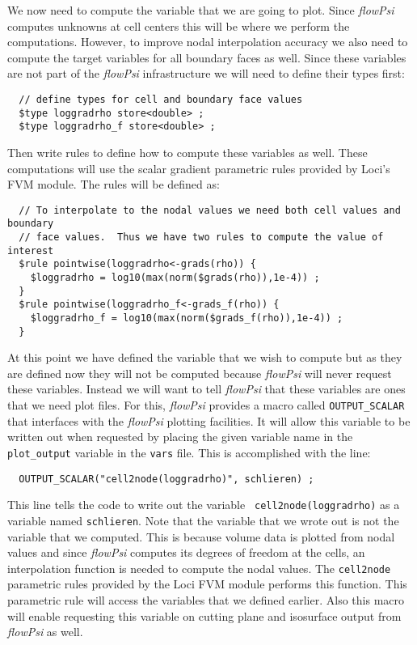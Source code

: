 \documentclass[letterpaper,twoside]{article}
\begin{document}
We now need to compute the variable that we are going to plot.  Since
{\it flowPsi} computes unknowns at cell centers this will be where we perform
the computations.  However, to improve nodal interpolation accuracy we
also need to compute the target variables for all boundary faces as
well.  Since these variables are not part of the {\it flowPsi} infrastructure
we will need to define their types first:
\begin{verbatim}
  // define types for cell and boundary face values
  $type loggradrho store<double> ;
  $type loggradrho_f store<double> ;
\end{verbatim}
Then write rules to define how to compute these variables as well.
These computations will use the scalar gradient parametric rules
provided by Loci's FVM module.  The rules will be defined as:
\begin{verbatim}
  // To interpolate to the nodal values we need both cell values and boundary
  // face values.  Thus we have two rules to compute the value of interest
  $rule pointwise(loggradrho<-grads(rho)) {
    $loggradrho = log10(max(norm($grads(rho)),1e-4)) ;
  }
  $rule pointwise(loggradrho_f<-grads_f(rho)) {
    $loggradrho_f = log10(max(norm($grads_f(rho)),1e-4)) ;
  }
\end{verbatim}

At this point we have defined the variable that we wish to compute but
as they are defined now they will not be computed because {\it flowPsi} will
never request these variables.  Instead we will want to tell {\it flowPsi} that
these variables are ones that we need plot files.  For this, {\it flowPsi}
provides a macro called {\tt OUTPUT\_SCALAR} that interfaces with the
{\it flowPsi} plotting facilities.  It will allow this variable to be written
out when requested by placing the given variable name in the {\tt
  plot\_output} variable in the {\tt vars} file.  This is accomplished
with the line:
\begin{verbatim}
  OUTPUT_SCALAR("cell2node(loggradrho)", schlieren) ;
\end{verbatim}
This line tells the code to write out the variable {\tt
  cell2node(loggradrho)} as a variable named {\tt schlieren}.  Note
that the variable that we wrote out is not the variable that we
computed.  This is because volume data is plotted from nodal values
and since {\it flowPsi} computes its degrees of freedom at the cells, an
interpolation function is needed to compute the nodal values.  The
{\tt cell2node} parametric rules provided by the Loci FVM module
performs this function.  This parametric rule will access the
variables that we defined earlier.  Also this macro will enable
requesting this variable on cutting plane and isosurface output from
{\it flowPsi} as well.
\end{document}
